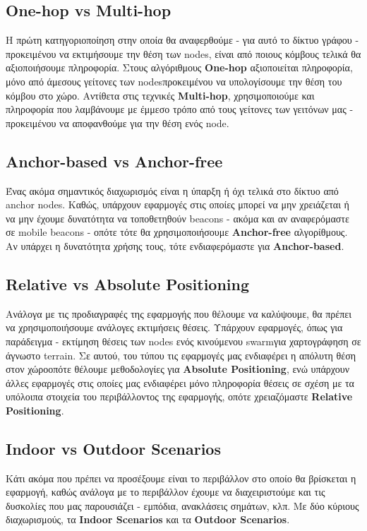 \subsection{One-hop vs Multi-hop}
Η πρώτη κατηγοριοποίηση στην οποία θα αναφερθούμε - για αυτό το δίκτυο γράφου - προκειμένου να εκτιμήσουμε την θέση των nodes, 
είναι από ποιους κόμβους τελικά θα αξιοποιήσουμε πληροφορία. Στους αλγόριθμους \textbf{One-hop} αξιοποιείται πληροφορία,
μόνο από άμεσους γείτονες των nodes\udot προκειμένου να υπολογίσουμε την θέση του κόμβου στο χώρο. Αντίθετα 
στις τεχνικές \textbf{Multi-hop}, χρησιμοποιούμε και πληροφορία που λαμβάνουμε με έμμεσο τρόπο\udot
από τους γείτονες των γειτόνων μας - προκειμένου να αποφανθούμε για την θέση ενός node.

\subsection{Anchor-based vs Anchor-free}
Ένας ακόμα σημαντικός διαχωρισμός είναι η ύπαρξη ή όχι τελικά στο δίκτυο από anchor nodes. Καθώς, υπάρχουν εφαρμογές
στις οποίες μπορεί να μην χρειάζεται ή να μην έχουμε δυνατότητα να τοποθετηθούν beacons - ακόμα και αν αναφερόμαστε σε mobile beacons -
οπότε τότε θα χρησιμοποιήσουμε \textbf{Anchor-free} αλγορίθμους. Αν υπάρχει η δυνατότητα χρήσης τους, τότε ενδιαφερόμαστε για
\textbf{Anchor-based}.

\subsection{Relative vs Absolute Positioning}
Ανάλογα με τις προδιαγραφές της εφαρμογής που θέλουμε να καλύψουμε, θα πρέπει να χρησιμοποιήσουμε ανάλογες εκτιμήσεις θέσεις.
Υπάρχουν εφαρμογές, όπως για παράδειγμα - εκτίμηση θέσεις των nodes ενός κινούμενου swarm\udot για χαρτογράφηση σε άγνωστο terrain. Σε αυτού, 
του τύπου τις εφαρμογές μας ενδιαφέρει η απόλυτη θέση στον χώρο\udot οπότε θέλουμε μεθοδολογίες για \textbf{Absolute Positioning}, ενώ 
υπάρχουν άλλες εφαρμογές στις οποίες μας ενδιαφέρει μόνο πληροφορία θέσεις σε σχέση με τα υπόλοιπα στοιχεία του περιβάλλοντος της
εφαρμογής, οπότε χρειαζόμαστε \textbf{Relative Positioning}.

\subsection{Indoor vs Outdoor Scenarios}
Κάτι ακόμα που πρέπει να προσέξουμε είναι το περιβάλλον στο οποίο θα βρίσκεται η εφαρμογή, καθώς ανάλογα με το περιβάλλον\udot
έχουμε να διαχειριστούμε και τις δυσκολίες που μας παρουσιάζει - εμπόδια, ανακλάσεις σημάτων, κλπ. Με δύο κύριους διαχωρισμούς,
τα \textbf{Indoor Scenarios} και τα \textbf{Outdoor Scenarios}.

